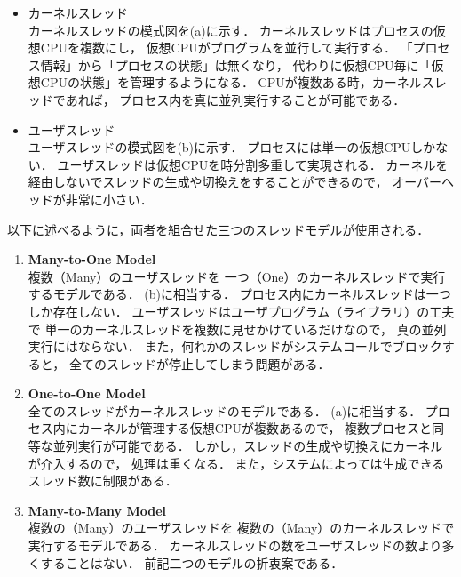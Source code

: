 \begin{itemize}
\item カーネルスレッド \\
カーネルスレッドの模式図を(a)に示す．
カーネルスレッドはプロセスの仮想CPUを複数にし，
仮想CPUがプログラムを並行して実行する．
「プロセス情報」から「プロセスの状態」は無くなり，
代わりに仮想CPU毎に「仮想CPUの状態」を管理するようになる．
CPUが複数ある時，カーネルスレッドであれば，
プロセス内を真に並列実行することが可能である．

\item ユーザスレッド \\
ユーザスレッドの模式図を(b)に示す．
プロセスには単一の仮想CPUしかない．
ユーザスレッドは仮想CPUを時分割多重して実現される．
カーネルを経由しないでスレッドの生成や切換えをすることができるので，
オーバーヘッドが非常に小さい．
\end{itemize}

以下に述べるように，両者を組合せた三つのスレッドモデルが使用される．

\begin{enumerate}
\item {\bf Many-to-One Model} \\
複数（Many）のユーザスレッドを
一つ（One）のカーネルスレッドで実行するモデルである．
(b)に相当する．
プロセス内にカーネルスレッドは一つしか存在しない．
ユーザスレッドはユーザプログラム（ライブラリ）の工夫で
単一のカーネルスレッドを複数に見せかけているだけなので，
真の並列実行にはならない．
また，何れかのスレッドがシステムコールでブロックすると，
全てのスレッドが停止してしまう問題がある．

\item {\bf One-to-One Model} \\
全てのスレッドがカーネルスレッドのモデルである．
(a)に相当する．
プロセス内にカーネルが管理する仮想CPUが複数あるので，
複数プロセスと同等な並列実行が可能である．
しかし，スレッドの生成や切換えにカーネルが介入するので，
処理は重くなる．
また，システムによっては生成できるスレッド数に制限がある．

\item {\bf Many-to-Many Model} \\
複数の（Many）のユーザスレッドを
複数の（Many）のカーネルスレッドで実行するモデルである．
カーネルスレッドの数をユーザスレッドの数より多くすることはない．
前記二つのモデルの折衷案である．
\end{enumerate}

